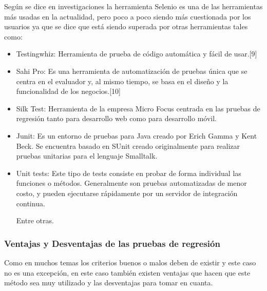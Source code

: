 \documentclass[conference]{IEEEtran}
\begin{document}
Según se dice en investigaciones la herramienta Selenio es una de las herramientas más usadas en la actualidad, pero poco a poco siendo más cuestionada por los usuarios ya que se dice que está siendo superada por otras herramientas tales como:
\begin{itemize}
\item Testingwhiz: Herramienta de prueba de código automática y fácil de usar.[9]

\item Sahi Pro: Es una herramienta de automatización de pruebas única que se centra en el evaluador y, al mismo tiempo, se basa en el diseño y la funcionalidad de los negocios.[10]

\item Silk Test: Herramienta de la empresa Micro Focus centrada en las pruebas de regresión tanto para desarrollo web como para desarrollo móvil.

\item Junit: Es un entorno de pruebas para Java creado por Erich Gamma y Kent Beck. Se encuentra basado en SUnit creado originalmente para realizar pruebas unitarias para el lenguaje Smalltalk.

\item Unit tests: Este tipo de tests consiste en probar de forma individual las funciones o métodos. Generalmente son pruebas automatizadas de menor costo, y pueden ejecutarse rápidamente por un servidor de integración continua.

Entre otras.

\end{itemize}

\subsubsection{Ventajas y Desventajas de las pruebas de regresión} 

Como en muchos temas los criterios buenos o malos deben de existir y este caso no es una excepción, en este caso también existen ventajas que hacen que este método sea muy utilizado y las desventajas para tomar en cuanta.
\end{document}
